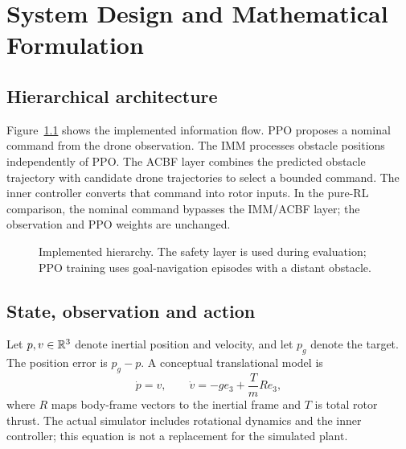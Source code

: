 \chapter{System Design and Mathematical Formulation}\label{ch:design}
\section{Hierarchical architecture}
Figure~\ref{fig:architecture} shows the implemented information flow. PPO proposes a nominal command from the drone observation. The IMM processes obstacle positions independently of PPO. The ACBF layer combines the predicted obstacle trajectory with candidate drone trajectories to select a bounded command. The inner controller converts that command into rotor inputs. In the pure-RL comparison, the nominal command bypasses the IMM/ACBF layer; the observation and PPO weights are unchanged.

\begin{figure}[htbp]\centering
{}
\caption{Implemented hierarchy. The safety layer is used during evaluation; PPO training uses goal-navigation episodes with a distant obstacle.}\label{fig:architecture}
\end{figure}

\section{State, observation and action}
Let $p,v\in\mathbb{R}^3$ denote inertial position and velocity, and let $p_g$ denote the target. The position error is $p_g-p$. A conceptual translational model is
\begin{equation}
\dot p=v,\qquad \dot v=-g e_3+\frac{T}{m}R e_3,
\end{equation}
where $R$ maps body-frame vectors to the inertial frame and $T$ is total rotor thrust. The actual simulator includes rotational dynamics and the inner controller; this equation is not a replacement for the simulated plant.

